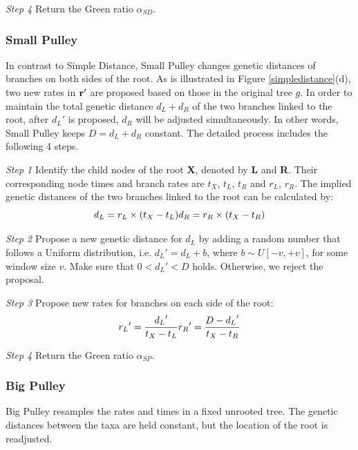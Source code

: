 \documentclass{bmcart}
\begin{document}
\emph{Step 4} Return the Green ratio ${\alpha_{SD}}$.
\subsubsection*{Small Pulley}
In contrast to Simple Distance, Small Pulley changes genetic distances of branches on both sides of the root. As is illustrated in Figure \ref{simpledistance}(d), two new rates in $\bf{r}'$ are proposed based on those in the original tree $g$. In order to maintain the total genetic distance $d_L + d_R$ of the two branches linked to the root, after ${d_L}'$ is proposed, $d_R$ will be adjusted simultaneously. In other words, Small Pulley keeps $D = d_L + d_R$ constant. The detailed process includes the following 4 steps.

\emph{Step 1} Identify the child nodes of the root \textbf{X}, denoted by \textbf{L} and \textbf{R}. Their corresponding node times and branch rates are $t_X$, $t_L$, $t_R$ and $r_L$, $r_R$. The implied genetic distances of the two branches linked to the root can be calculated by:
\begin{equation}
\label{sma1_dis}
{d_L} = {r_L} \times ({{t_X} - {t_L}})\\
{d_R} = {r_R} \times ({{t_X} - {t_R}})
 \end{equation}

\emph{Step 2} Propose a new genetic distance for $d_L$ by adding a random number that follows a Uniform distribution, i.e.  ${d_L}' = {d_L} + b$, where $b \sim U[ - v, + v]$, for some window size $v$. Make sure that $0 < {d_L}' < D$ holds. Otherwise, we reject the proposal.

\emph{Step 3} Propose new rates for branches on each side of the root:
\begin{equation}
\label{sma1_rate}
{r_L}' = \frac{{{d_L}'}}{{{t_X} - {t_L}}}\\
{r_R}' = \frac{{D - {d_L}'}}{{{t_X} - {t_R}}}
 \end{equation}

\emph{Step 4} Return the Green ratio ${\alpha_{SP}}$.
\subsubsection*{Big Pulley}
Big Pulley resamples the rates and times in a fixed unrooted tree. The genetic distances between the taxa are held constant, but the location of the root is readjusted.
\end{document}
